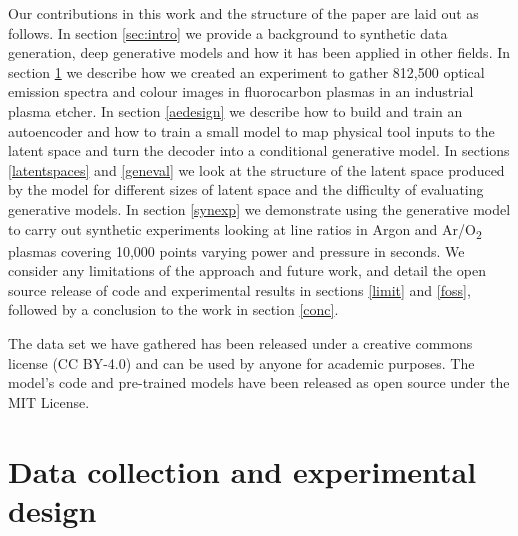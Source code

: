 \documentclass[10pt]{iopart}
\begin{document}
Our contributions in this work and the structure of the paper are laid out as follows. In section \ref{sec:intro} we provide a background to synthetic data generation, deep generative models and how it has been applied in other fields. In section \ref{experimentdesign} we describe how we created an experiment to gather 812,500 optical emission spectra and colour images in fluorocarbon plasmas in an industrial plasma etcher. In section \ref{aedesign} we describe how to build and train an autoencoder and how to train a small model to map physical tool inputs to the latent space and turn the decoder into a conditional generative model. In sections \ref{latentspaces} and \ref{geneval} we look at the structure of the latent space produced by the model for different sizes of latent space and the difficulty of evaluating generative models. In section \ref{synexp} we demonstrate using the generative model to carry out synthetic experiments looking at line ratios in Argon and Ar/O\textsubscript{2} plasmas covering 10,000 points varying power and pressure in seconds. We consider any limitations of the approach and future work, and detail the open source release of code and experimental results in sections \ref{limit} and \ref{foss}, followed by a conclusion to the work in section \ref{conc}. 

The data set we have gathered has been released under a creative commons license (CC BY-4.0) and can be used by anyone for academic purposes. The model's code and pre-trained models have been released as open source under the MIT License.



\section{Data collection and experimental design}\label{experimentdesign}
\end{document}
